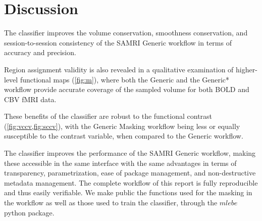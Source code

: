 \section{Discussion}

The classifier improves the volume conservation, smoothness conservation, and session-to-session consistency of the SAMRI Generic workflow in terms of accuracy and precision.

Region assignment validity is also revealed in a qualitative examination of higher-level functional maps (\cref{fig:m}), where both the Generic and the Generic* workflow provide accurate coverage of the sampled volume for both BOLD and CBV fMRI data.

These benefits of the classifier are robust to the functional contrast (\cref{fig:vccv,fig:sccv}), with the Generic Masking workflow being less or equally susceptible to the contrast variable, when compared to the Generic workflow.

The classifier improves the performance of the SAMRI Generic workflow, making these accessible in the same interface with the same advantages in terms of transparency, parametrization, ease of package management, and non-destructive metadata management.
The complete workflow of this report is fully reproducible and thus easily verifiable.
We make public the functions used for the masking in the workflow as well as those used to train the classifier, through the \textcolor{mg}{\texttt{$mlebe$}} python package.

